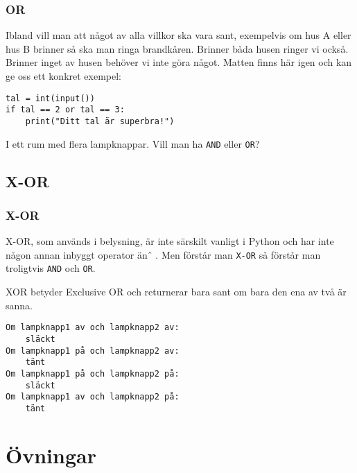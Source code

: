 \documentclass[aspectratio=169]{beamer}
\begin{document}
\begin{frame}[fragile]
	\frametitle{OR}
	
	Ibland vill man att något av alla villkor ska vara sant, exempelvis om hus A eller hus B brinner så ska man ringa brandkåren. Brinner båda husen ringer vi också. Brinner inget av husen behöver vi inte göra något.
	\pause
	Matten finns här igen och kan ge oss ett konkret exempel:
	\begin{lstlisting}
tal = int(input())
if tal == 2 or tal == 3:
    print("Ditt tal är superbra!")
	\end{lstlisting} \pause
	
	I ett rum med flera lampknappar. Vill man ha \texttt{AND} eller \texttt{OR}?

\end{frame}

\subsection{X-OR}

\begin{frame}[fragile]
	\frametitle{X-OR}
	
	X-OR, som används i belysning, är inte särskilt vanligt i Python och har inte någon annan inbyggt operator än \^\, . Men förstår man \texttt{X-OR} så förstår man troligtvis \texttt{AND} och \texttt{OR}.
	
	XOR betyder Exclusive OR och returnerar bara sant om bara den ena av två är sanna.
	
	\begin{verbatim}
Om lampknapp1 av och lampknapp2 av:
    släckt
Om lampknapp1 på och lampknapp2 av:
    tänt
Om lampknapp1 på och lampknapp2 på:
    släckt
Om lampknapp1 av och lampknapp2 på:
    tänt
	\end{verbatim}
\end{frame}

\section{Övningar}
\end{document}

